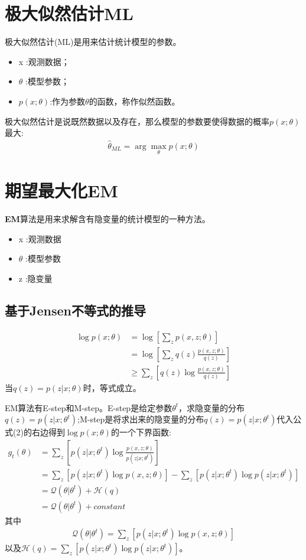 \documentclass[UTF8]{ctexart}
\newenvironment{pitemize}{
	\vspace{-3mm}
	\begin{itemize}
		\setlength{\itemsep}{1pt}
		\setlength{\parskip}{0pt}
		\setlength{\parsep}{0pt}
	}{\end{itemize}}
\begin{document}
\section{极大似然估计ML}
极大似然估计(ML)是用来估计统计模型的参数。
\begin{pitemize}
	\item x :观测数据；
	\item $\theta$ :模型参数；
    \item $p(x;\theta)$:作为参数$\theta$的函数，称作似然函数。
\end{pitemize}
极大似然估计是说既然数据以及存在，那么模型的参数要使得数据的概率$p(x;\theta)$最大:
\begin{align}
  \hat{\theta}_{ML} = \arg\max\limits_{\theta} p(x;\theta) \tag{1}
\end{align}

\section{期望最大化EM}
\textbf{EM}算法是用来求解含有隐变量的统计模型的一种方法。

\begin{pitemize}
	\item x :观测数据
	\item $\theta$ :模型参数
	\item z :隐变量
\end{pitemize}
\subsection{基于Jensen不等式的推导}

\begin{align*}
    \log p(x;\theta) &= \log\left[\sum_{z}p(x,z;\theta)\right] \\
    &= \log\left[\sum_{z}q(z)\frac{p(x,z;\theta)}{q(z)}\right] \\
    &\geq \sum_{z}\left[q(z)\log\frac{p(x,z;\theta)}{q(z)}\right] \tag{2}
\end{align*}
当$q(z)=p(z|x;\theta)$时，等式成立。

EM算法有E-step和M-step。E-step是给定参数$\theta^{t}$，求隐变量的分布$q(z)=p(z|x;\theta^{t})$;M-step是将求出来的隐变量的分布$q(z)=p(z|x;\theta^{t})$代入公式(2)的右边得到$\log p(x;\theta)$的一个下界函数:
\begin{align*}
    g_{t}(\theta) &= \sum_{z}\left[p(z|x;\theta^{t})\log\frac{p(x,z;\theta)}{p(z|x;\theta^{t})}\right] \\
    &= \sum_{z}\left[p(z|x;\theta^t)\log p(x, z;\theta)\right] - \sum_{z}\left[p(z|x;\theta^t)\log p(z|x;\theta^t)\right] \\
    &= \mathcal{Q}(\theta|\theta^t) + \mathcal{H}(q) \\
    &= \mathcal{Q}(\theta|\theta^t) + constant \tag{3}
\end{align*}
其中
\begin{align}
  \mathcal{Q}(\theta|\theta^t)=\sum_{z}\left[p(z|x;\theta^t)\log p(x, z;\theta)\right] \tag{4}
\end{align}
以及$\mathcal{H}(q)= \sum_{z}\left[p(z|x;\theta^t)\log p(z|x;\theta^t)\right]$。
\end{document}

